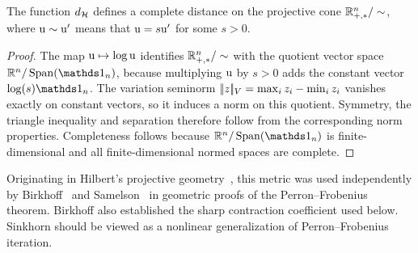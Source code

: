 \begin{prop}
	The function $d_{\mathcal{H}}$ defines a complete distance on the projective cone $\mathbb{R}_{+,*}^n/\sim$, where $\mathrm{u} \sim \mathrm{u}'$ means that $\mathrm{u}=s\mathrm{u}'$ for some $s>0$.
\end{prop}
\begin{proof}
	The map $\mathrm{u} \mapsto \log \mathrm{u}$ identifies $\mathbb{R}_{+,*}^n/\sim$ with the quotient vector space $\RR^n/\Span(\ones_n)$, because multiplying $\mathrm{u}$ by $s>0$ adds the constant vector $\log(s)\ones_n$. The variation seminorm $|\!| z |\!|_V=\max_i z_i-\min_i z_i$ vanishes exactly on constant vectors, so it induces a norm on this quotient. Symmetry, the triangle inequality and separation therefore follow from the corresponding norm properties. Completeness follows because $\RR^n/\Span(\ones_n)$ is finite-dimensional and all finite-dimensional normed spaces are complete.
\end{proof}
%
Originating in Hilbert's projective geometry~\cite{hilbert1895gerade}, this metric was used independently by Birkhoff~\cite{birkhoff1957extensions} and Samelson~\cite{samelson1957perron} in geometric proofs of the Perron--Frobenius theorem. Birkhoff also established the sharp contraction coefficient used below. Sinkhorn should be viewed as a nonlinear generalization of Perron--Frobenius iteration.


